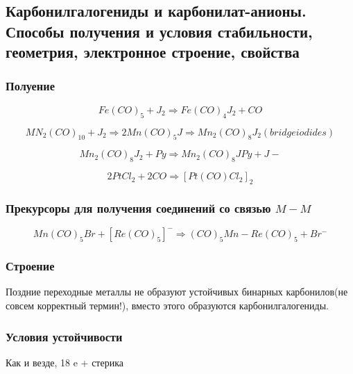 \subsection{ Карбонилгалогениды и карбонилат-анионы. Способы получения и условия стабильности, геометрия, электронное строение, свойства}

\subsubsection*{Полуение}

$$Fe(CO)_5 + J_2 \Rightarrow Fe(CO)_4J_2 + CO$$

$$MN_2(CO)_{10} + J_2 \Rightarrow 2 Mn(CO)_5J \Rightarrow Mn_2(CO)_8J_2(bridge iodides)$$

$$Mn_2(CO)_8J_2 + Py \Rightarrow Mn_2(CO)_8JPy + J-$$

$$2PtCl_2 + 2CO \Rightarrow [Pt(CO)Cl_2]_2$$

\subsubsection*{Прекурсоры для получения соединений со связью $M-M$}

$$Mn(CO)_5Br + [Re(CO)_5]^- \Rightarrow (CO)_5Mn-Re(CO)_5 + Br^-$$

\subsubsection*{Строение}

Поздние переходные металлы не образуют устойчивых бинарных карбонилов(не совсем корректный термин!), вместо этого образуются карбонилгалогениды.


\subsubsection*{Условия устойчивости}

Как и везде, 18 e + стерика
